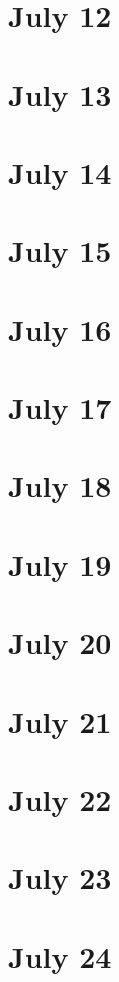 \section{July 12}

\section{July 13}

\section{July 14}

\section{July 15}

\section{July 16}

\section{July 17}

\section{July 18}

\section{July 19}

\section{July 20}

\section{July 21}

\section{July 22}

\section{July 23}

\section{July 24}

